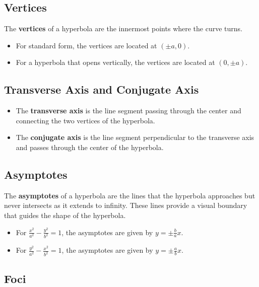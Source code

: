 \documentclass[12pt]{article}
\begin{document}
\newpage

\subsection*{Vertices}
The \textbf{vertices} of a hyperbola are the innermost points where the curve turns.
\begin{itemize}
\item For standard form, the vertices are located at $(\pm a, 0)$.
\item For a hyperbola that opens vertically, the vertices are located at $(0, \pm a)$.
\end{itemize}

\subsection*{Transverse Axis and Conjugate Axis}
\begin{itemize}
\item The \textbf{transverse axis} is the line segment passing through the center and connecting the two vertices of the hyperbola.\\
\item The \textbf{conjugate axis} is the line segment perpendicular to the transverse axis and passes through the center of the hyperbola.\\
\end{itemize}

\subsection*{Asymptotes}
The \textbf{asymptotes} of a hyperbola are the lines that the hyperbola approaches but never intersects as it extends to infinity. These lines provide a visual boundary that guides the shape of the hyperbola.

\begin{itemize}
\item For \(\frac{x^2}{a^2} - \frac{y^2}{b^2} = 1\), the asymptotes are given by $y = \pm \frac{b}{a} x$.
\item For \(\frac{y^2}{a^2} - \frac{x^2}{b^2} = 1\), the asymptotes are given by $y = \pm \frac{a}{b} x$.
\end{itemize}

\newpage

\subsection*{Foci}
\end{document}
